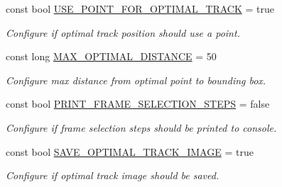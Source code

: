 \begin{DoxyCompactItemize}
\mbox{\label{namespacedto_1_1_configuration_aa61703c82d480166e1ffec7b6cb148a8}} 
const bool \mbox{\hyperlink{namespacedto_1_1_configuration_aa61703c82d480166e1ffec7b6cb148a8}{U\+S\+E\+\_\+\+P\+O\+I\+N\+T\+\_\+\+F\+O\+R\+\_\+\+O\+P\+T\+I\+M\+A\+L\+\_\+\+T\+R\+A\+CK}} = true
\begin{DoxyCompactList}\small\item\em Configure if optimal track position should use a point. \end{DoxyCompactList}\item 
\mbox{\label{namespacedto_1_1_configuration_ab652e3df087f56c5b5a47460dce32fc2}} 
const long \mbox{\hyperlink{namespacedto_1_1_configuration_ab652e3df087f56c5b5a47460dce32fc2}{M\+A\+X\+\_\+\+O\+P\+T\+I\+M\+A\+L\+\_\+\+D\+I\+S\+T\+A\+N\+CE}} = 50
\begin{DoxyCompactList}\small\item\em Configure max distance from optimal point to bounding box. \end{DoxyCompactList}\item 
\mbox{\label{namespacedto_1_1_configuration_a688b3d39ba17d5a3122042994e4db152}} 
const bool \mbox{\hyperlink{namespacedto_1_1_configuration_a688b3d39ba17d5a3122042994e4db152}{P\+R\+I\+N\+T\+\_\+\+F\+R\+A\+M\+E\+\_\+\+S\+E\+L\+E\+C\+T\+I\+O\+N\+\_\+\+S\+T\+E\+PS}} = false
\begin{DoxyCompactList}\small\item\em Configure if frame selection steps should be printed to console. \end{DoxyCompactList}\item 
\mbox{\label{namespacedto_1_1_configuration_a0fb2aac8be969946085c168973ae39b9}} 
const bool \mbox{\hyperlink{namespacedto_1_1_configuration_a0fb2aac8be969946085c168973ae39b9}{S\+A\+V\+E\+\_\+\+O\+P\+T\+I\+M\+A\+L\+\_\+\+T\+R\+A\+C\+K\+\_\+\+I\+M\+A\+GE}} = true
\begin{DoxyCompactList}\small\item\em Configure if optimal track image should be saved. \end{DoxyCompactList}\item 
\mbox{\label{namespacedto_1_1_configuration_a7b0c436a8122986f85e489e0900a9f88}} 

\end{DoxyCompactItemize}
